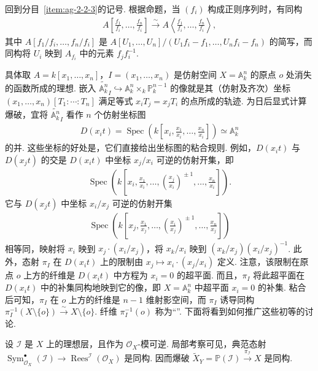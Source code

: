 回到分目~\ref{item:ag-2-2-3}的记号. 根据命题，当 $(f_i)$ 构成正则序列时，有同构
\begin{align*}
A\left[\frac{f_1}{f_i},\ldots,\frac{f_n}{f_i}\right]\xrightarrow\sim A\left\langle\frac{f_1}{f_i},\ldots,\frac{f_n}{f_i}\right\rangle,
\end{align*}
其中 $A[f_1/f_i,\ldots,f_n/f_i]$ 是 $A[U_1,\ldots,U_n]/(U_1f_i-f_1,\ldots,U_nf_i-f_n)$ 的简写，而同构将 $U_i$ 映到 $A_{f_i}$ 中的元素 $f_jf_i^{-1}$.
\begin{example*}
具体取 $A=k[x_1,\ldots,x_n]$，$I=(x_1,\ldots,x_n)$ 是仿射空间 $X=\mathbb A_k^n$ 的原点 $o$ 处消失的函数所成的理想. 嵌入 $\widetilde{\mathbb A_k^n}_I\hookrightarrow\mathbb A_k^n\times_k\mathbb P_k^{n-1}$ 的像就是其（仿射及齐次）坐标 $(x_1,\ldots,x_n)[T_1:\cdots:T_n]$ 满足等式 $x_iT_j=x_jT_i$ 的点所成的轨迹. 为日后显式计算爆破，宜将 $\widetilde{\mathbb A_k^n}_I$ 看作 $n$ 个仿射坐标图
\begin{align*}
D(x_it)=\operatorname{Spec}\left(k\left[x_i,\frac{x_1}{x_i},\ldots,\frac{x_n}{x_i}\right]\right)\simeq\mathbb A_k^n
\end{align*}
的并. 这些坐标的好处是，它们直接给出坐标图的粘合规则. 例如，$D(x_it)$ 与 $D(x_jt)$ 的交是 $D(x_it)$ 中坐标 $x_j/x_i$ 可逆的仿射开集，即
\begin{align*}
\operatorname{Spec}\left(k\left[x_i,\frac{x_1}{x_i},\ldots,\left(\frac{x_j}{x_i}\right)^{\!\pm1},\ldots,\frac{x_n}{x_i}\right]\right).
\end{align*}
它与 $D(x_jt)$ 中坐标 $x_i/x_j$ 可逆的仿射开集
\begin{align*}
\operatorname{Spec}\left(k\left[x_j,\frac{x_1}{x_j},\ldots,\left(\frac{x_i}{x_j}\right)^{\!\pm1},\ldots,\frac{x_n}{x_j}\right]\right)
\end{align*}
相等同，映射将 $x_i$ 映到 $x_j\cdot(x_i/x_j)$，将 $x_k/x_i$ 映到 $(x_k/x_j)(x_i/x_j)^{-1}$. 此外，态射 $\pi_I$ 在 $D(x_it)$ 上的限制由 $x_j\mapsto x_i\cdot(x_j/x_i)$ 定义. 注意，该限制在原点 $o$ 上方的纤维是 $D(x_it)$ 中方程为 $x_i=0$ 的超平面. 而且，$\pi_I$ 将此超平面在 $D(x_it)$ 中的补集同构地映到它的像，即 $X=\mathbb A_k^n$ 中超平面 $x_i=0$ 的补集. 粘合后可知，$\pi_I$ 在 $o$ 上方的纤维是 $n-1$ 维射影空间，而 $\pi_I$ 诱导同构 $\pi_I^{-1}(X\setminus\{o\})\xrightarrow\sim X\setminus\{o\}$. 纤维 $\pi_I^{-1}(o)$ 称为``''. 下面将看到如何推广这些初等的讨论.
\end{example*}
\begin{numpara}[可逆理想的爆破]\label{item:ag-2-2-5}
设 $\mathcal I$ 是 $X$ 上的理想层，且作为 $\mathcal O_X$-模可逆. 局部考察可见，典范态射 $\operatorname{Sym}_{\mathcal O_X}^{\bullet}(\mathcal I)\longrightarrow\operatorname{Rees}^{\mathcal I}(\mathcal O_X)$ 是同构. 因而爆破 $\widetilde X_Y=\mathbb P(\mathcal I)\xrightarrow{\pi_{\mathcal I}}X$ 是同构.
\end{numpara}
